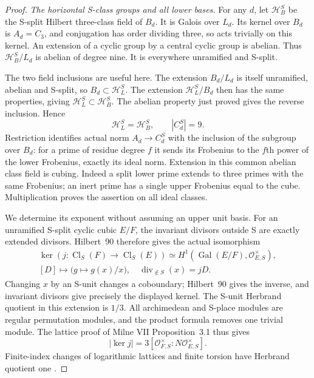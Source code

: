 \begin{proof}
\emph{The horizontal S-class groups and all lower bases.}
For any $d$, let $\mathcal H_B^S$ be the S-split
Hilbert three-class field of $B_d$. It is Galois
over $L_d$. Its kernel over $B_d$ is $A_d=C_3$,
and conjugation has order dividing three, so
acts trivially on this kernel. An extension
of a cyclic group by a central cyclic group
is abelian. Thus $\mathcal H_B^S/L_d$ is
abelian of degree nine. It is everywhere
unramified and S-split.

The two field inclusions are useful here.
The extension $B_d/L_d$ is itself unramified,
abelian and S-split, so $B_d\subset\mathcal H_L^S$.
The extension $\mathcal H_L^S/B_d$ then has
the same properties, giving
$\mathcal H_L^S\subset\mathcal H_B^S$.
The abelian property just proved gives the
reverse inclusion. Hence
\[
 \mathcal H_L^S=\mathcal H_B^S,\qquad
                   |C_d^S|=9.
 \tag{E86.21}
\]
Restriction identifies actual norm $A_d\to C_d^S$
with the inclusion of the subgroup over $B_d$:
for a prime of residue degree $f$ it sends its
Frobenius to the $f$th power of the lower
Frobenius, exactly its ideal norm. Extension
in this common abelian class field is cubing.
Indeed a split lower prime extends to three
primes with the same Frobenius; an inert prime
has a single upper Frobenius equal to the cube.
Multiplication proves the assertion on all
ideal classes.

We determine its exponent without assuming an
upper unit basis. For an unramified S-split
cyclic cubic $E/F$, the invariant divisors
outside S are exactly extended divisors.
Hilbert~90 therefore gives the actual
isomorphism
\[
 \begin{gathered}
 \ker(j:\operatorname{Cl}_S(F)\to\operatorname{Cl}_S(E))
       \simeq H^1(\operatorname{Gal}(E/F),\mathcal O_{E,S}^\times),\\
 [D]\longmapsto\bigl(g\mapsto g(x)/x\bigr),
 \quad \operatorname{div}_{\notin S}(x)=jD.
 \end{gathered}
 \tag{E86.22}
\]
Changing $x$ by an S-unit changes a coboundary;
Hilbert~90 gives the inverse, and invariant
divisors give precisely the displayed kernel.
The S-unit Herbrand quotient in this extension
is $1/3$. All archimedean and S-place modules
are regular permutation modules, and the
product formula removes one trivial module.
The lattice proof of Milne VII Proposition~3.1
thus gives
\[
 |\ker j|=3[\mathcal O_{F,S}^\times:
                         N\mathcal O_{E,S}^\times].
 \tag{E86.23}
\]
Finite-index changes of logarithmic lattices
and finite torsion have Herbrand quotient one
\cite{E_MilneCFT}.


\end{proof}
